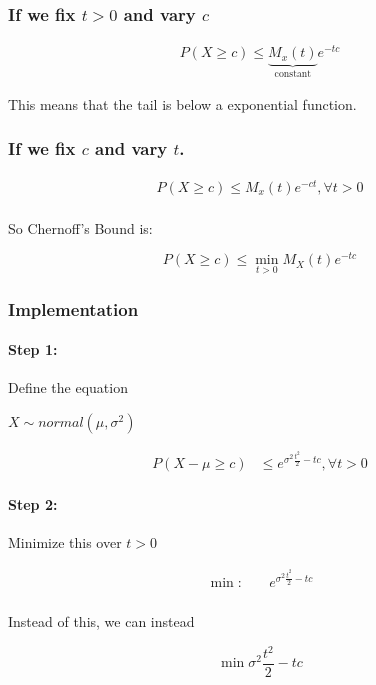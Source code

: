 \documentclass{report}
\begin{document}
\subsubsection{If we fix $ t >0 $  and vary $ c $ }

\begin{align*}
	P(X \ge c) \le \underbrace{M_{x}(t)}_{\text{constant}}e^{-tc}
\end{align*}


This means that the tail is below a exponential function. 


\subsubsection{If we fix $ c $ and vary $ t $. }

\begin{align*}
	P(X \ge c) \le M_{x}(t)e^{-ct},  \forall t>0  \\
\end{align*}

So Chernoff's Bound is:

\[
P(X \ge c) \le \min_{t>0} M_{X}(t) e^{-tc}
\]

\subsubsection{Implementation}


\paragraph{Step 1:} Define the equation


$ X \sim normal(\mu , \sigma^{2}) $ 

\begin{align*}
	P(X - \mu  \ge c) &\le e^{\sigma^{2} \frac{t^{2}}{2} - tc}, \forall t>0  
\end{align*}

\paragraph{Step 2:}

Minimize this over $ t>0 $ 

\begin{align*}
\min_{}: \quad & e^{\sigma^{2} \frac{t^{2}}{2} -tc} \\
\end{align*}


Instead of this, we can instead 

\[
\min \sigma^{2} \frac{t^{2}}{2} -tc
\]
\end{document}
